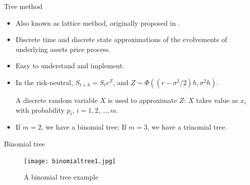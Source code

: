 \documentclass[cjk,10pt]{beamer}
\begin{document}
\begin{frame}{Tree method}
\begin{itemize}
\item
Also known as lattice method, originally proposed in \cite{cox1979}.
\item
Discrete time and discrete state approximations of the evolvements of underlying assets price process.
\item
Easy to understand and implement. 
\item
In the risk-neutral, $S_{t+h} = S_t e^{Z}$, and $Z\sim \Phi((r-\sigma ^2 /2)h,\sigma ^2 h)$. 

A discrete random variable $X$ is used to approximate $Z$: $X$ takes value as $x_i$ with probability $p_i$, $i=1,2,...,m$. 
\item
If $m=2$, we have a binomial tree; If $m=3$, we have a trinomial tree. 
\end{itemize}
\end{frame} 

\begin{frame}{Binomial tree}
\begin{figure}[p]
   \centering
   \texttt{[image: binomialtree1.jpg]} %
   \caption{A binomial tree example}
   \label{f:lerr3}
\end{figure}
\end{frame}

%
%
\end{document}
